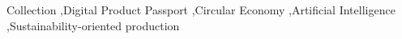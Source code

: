 \documentclass[3p,times,procedia]{elsarticle}
\begin{document}
\begin{frontmatter}
\begin{keyword}
Collection \sep Digital Product Passport \sep Circular Economy \sep Artificial Intelligence \sep Sustainability-oriented production \\





\end{keyword}
\end{frontmatter}












%
\end{document}
